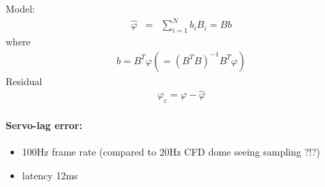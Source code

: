 \documentclass{gmto}
\begin{document}
Model:
\begin{eqnarray}
  \hat\varphi &=& \sum_{i=1}^N b_i B_i = Bb
\end{eqnarray}
where
\begin{eqnarray}
  b  = B^T\varphi ( =(B^TB)^{-1}B^T \varphi)
\end{eqnarray}
Residual
\begin{eqnarray}
  \varphi_\varepsilon = \varphi - \hat\varphi
\end{eqnarray}

\paragraph{Servo-lag error:}
\begin{itemize}
\item 100Hz frame rate (compared to 20Hz CFD dome seeing sampling ?!?)
\item latency 12ms
\end{itemize}

\printbibliography
\end{document}
